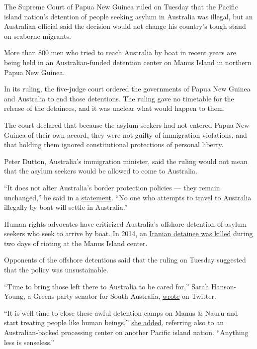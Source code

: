 The Supreme Court of Papua New Guinea ruled on Tuesday that the Pacific
island nation's detention of people seeking asylum in Australia was
illegal, but an Australian official said the decision would not change
his country's tough stand on seaborne migrants.

More than 800 men who tried to reach Australia by boat in recent years
are being held in an Australian-funded detention center on Manus Island
in northern Papua New Guinea.

In its ruling, the five-judge court ordered the governments of Papua New
Guinea and Australia to end those detentions. The ruling gave no
timetable for the release of the detainees, and it was unclear what
would happen to them.

The court declared that because the asylum seekers had not entered Papua
New Guinea of their own accord, they were not guilty of immigration
violations, and that holding them ignored constitutional protections of
personal liberty.

Peter Dutton, Australia's immigration minister, said the ruling would
not mean that the asylum seekers would be allowed to come to Australia.

``It does not alter Australia's border protection policies --- they
remain unchanged,'' he said in a
\href{http://www.minister.border.gov.au/peterdutton/2016/Pages/png-supreme-court-judgement.aspx}{statement}.
``No one who attempts to travel to Australia illegally by boat will
settle in Australia.''

Human rights advocates have criticized Australia's offshore detention of
asylum seekers who seek to arrive by boat. In 2014, an
\href{http://www.nytimes.com/2014/12/12/world/asia/australia-rioting-papua-new-guinea-manus-island.html}{Iranian
detainee was killed} during two days of rioting at the Manus Island
center.

Opponents of the offshore detentions said that the ruling on Tuesday
suggested that the policy was unsustainable.

``Time to bring those left there to Australia to be cared for,'' Sarah
Hanson-Young, a Greens party senator for South Australia,
\href{https://twitter.com/sarahinthesen8/status/724835760273297409}{wrote}
on Twitter.

``It is well time to close these awful detention camps on Manus \& Nauru
and start treating people like human beings,''
\href{https://twitter.com/sarahinthesen8/status/724849198223470592}{she
added}, referring also to an Australian-backed processing center on
another Pacific island nation. ``Anything less is senseless.''

